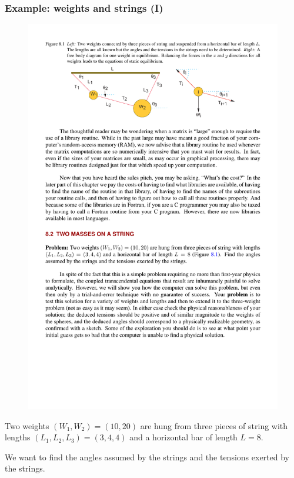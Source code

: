 \documentclass[hyperref={colorlinks=true}]{beamer}
\begin{document}
\begin{frame}%
  \frametitle{Example: weights and strings (I)}

  \begin{figure}
    \centering
    \includegraphics[width=0.85\columnwidth]{WeightsStrings.pdf}
  \end{figure}
  
  Two weights $(W_1, W_2) = (10, 20)$ are hung from three pieces of string with lengths $(L_1, L_2, L_3) = (3, 4, 4)$ and a horizontal bar of length $L = 8$. 
  
  \mysp
  
  We want to find the angles assumed by the strings and the tensions exerted by the strings.
 
  
\end{frame}

\end{document}
